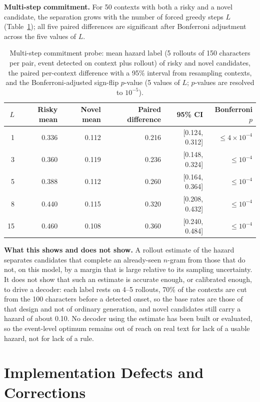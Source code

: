 \documentclass[11pt]{article}
\begin{document}
\textbf{Multi-step commitment.} For 50 contexts with both a risky and a novel candidate, the separation grows with the number of forced greedy steps $L$ (Table~\ref{tab:hazardprobe}); all five paired differences are significant after Bonferroni adjustment across the five values of $L$.

\begin{table}[ht]
\centering
\caption{Multi-step commitment probe: mean hazard label (5 rollouts of 150 characters per pair, event detected on context plus rollout) of risky and novel candidates, the paired per-context difference with a 95\% interval from resampling contexts, and the Bonferroni-adjusted sign-flip $p$-value (5 values of $L$; $p$-values are resolved to $10^{-5}$).}
\label{tab:hazardprobe}
\begin{tabular}{@{}rrrrrr@{}}
\toprule
$L$ & Risky mean & Novel mean & Paired difference & 95\% CI & Bonferroni $p$ \\
\midrule
1  & 0.336 & 0.112 & 0.216 & [0.124, 0.312] & $\le4\times10^{-4}$ \\
3  & 0.360 & 0.119 & 0.236 & [0.148, 0.324] & $\le10^{-4}$ \\
5  & 0.388 & 0.112 & 0.260 & [0.164, 0.364] & $\le10^{-4}$ \\
8  & 0.440 & 0.115 & 0.320 & [0.208, 0.432] & $\le10^{-4}$ \\
15 & 0.460 & 0.108 & 0.360 & [0.240, 0.484] & $\le10^{-4}$ \\
\bottomrule
\end{tabular}
\end{table}

\textbf{What this shows and does not show.} A rollout estimate of the hazard separates candidates that complete an already-seen $n$-gram from those that do not, on this model, by a margin that is large relative to its sampling uncertainty. It does not show that such an estimate is accurate enough, or calibrated enough, to drive a decoder: each label rests on 4--5 rollouts, 70\% of the contexts are cut from the 100 characters before a detected onset, so the base rates are those of that design and not of ordinary generation, and novel candidates still carry a hazard of about 0.10. No decoder using the estimate has been built or evaluated, so the event-level optimum remains out of reach on real text for lack of a usable hazard, not for lack of a rule.

\section{Implementation Defects and Corrections}
\label{app:defects}
\end{document}
